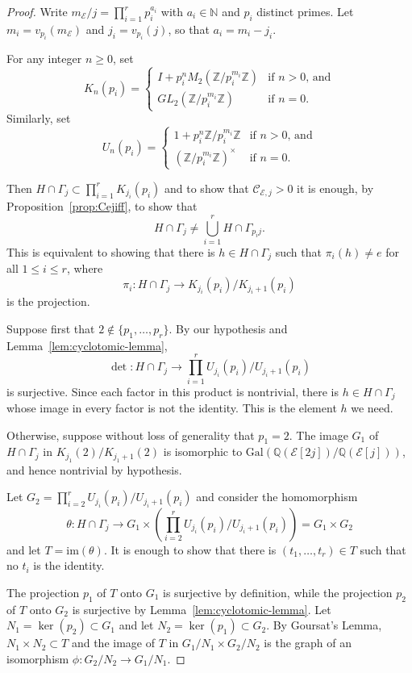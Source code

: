 \documentclass[10pt,a4paper]{amsart}
\newcommand{\Cc}{\mathcal{C}}
\newcommand{\E}{\mathcal{E}}
\newcommand{\Gal}{\mathrm{Gal}}
\newcommand{\N}{\mathbb{N}}
\newcommand{\Q}{\mathbb{Q}}
\newcommand{\Z}{\mathbb{Z}}
\newcommand{\im}{\mathrm{im}}
\begin{document}
\begin{proof}
    Write $m_\E/j = \prod_{i=1}^r p_i^{a_i}$ with $a_i \in \N$ and $p_i$ distinct primes. Let $m_i = v_{p_i}(m_\E)$ and $j_i = v_{p_i}(j)$, so that $a_i = m_i - j_i$. 

    For any integer $n\ge 0$, set 
    \[K_n(p_i) = \begin{cases}
        I + p_i^nM_2(\Z/p_i^{m_i}\Z) & \text{if $n > 0$, and}\\
        GL_2(\Z/p_i^{m_i}\Z) & \text{if $n = 0$.}
    \end{cases}\]
    Similarly, set 
     \[U_n(p_i) = \begin{cases}
        1 + p_i^n\Z/p_i^{m_i}\Z & \text{if $n > 0$, and}\\
        (\Z/p_i^{m_i}\Z)^\times & \text{if $n = 0$.}
    \end{cases}\]

    Then $H \cap \Gamma_j \subset \prod_{i=1}^r K_{j_i}(p_i)$ and to show that $\Cc_{\E,j} > 0$ it is enough, by Proposition~\ref{prop:Cejiff}, to show that 
    \[H \cap \Gamma_j \ne \bigcup_{i=1}^r H \cap \Gamma_{p_ij}.\]
    This is equivalent to showing that there is $h \in H \cap \Gamma_j$ such that $\pi_i(h) \ne e$ for all $1 \le i \le r$, where 
    \[\pi_i : H \cap \Gamma_j \to K_{j_i}(p_i)/K_{j_i + 1}(p_i)\]
    is the projection.

    Suppose first that $2 \not \in \{p_1, \ldots, p_r\}$. By our hypothesis and Lemma~\ref{lem:cyclotomic-lemma}, 
    \[\det : H \cap \Gamma_j \to \prod_{i=1}^r U_{j_i}(p_i)/U_{j_i+1}(p_i)\]
    is surjective. Since each factor in this product is nontrivial, there is $h \in H \cap \Gamma_j$ whose image in every factor is not the identity. This is the element $h$ we need.

    Otherwise, suppose without loss of generality that $p_1 = 2$. The image $G_1$ of $H\cap \Gamma_j$ in $K_{j_1}(2)/K_{j_1 + 1}(2)$ is isomorphic to $\Gal(\Q(\E[2j])/\Q(\E[j]))$, and hence nontrivial by hypothesis.

    Let $G_2 = \prod_{i=2}^rU_{j_i}(p_i)/U_{j_i + 1}(p_i)$ and consider the homomorphism 
    \[\theta : H \cap \Gamma_j \to G_1 \times \left(\prod_{i=2}^r U_{j_i}(p_i)/U_{j_i + 1}(p_i)\right) = G_1 \times G_2\]
    and let $T = \im(\theta)$. It is enough to show that there is $(t_1, \ldots, t_r) \in T$ such that no $t_i$ is the identity.
    
    The projection $p_1$ of $T$ onto $G_1$ is surjective by definition, while the projection $p_2$ of $T$ onto $G_2$ is
    surjective by Lemma~\ref{lem:cyclotomic-lemma}. Let $N_1 = \ker(p_2) \subset G_1$ and let
    $N_2 = \ker(p_1) \subset G_2$. By Goursat's Lemma, $N_1 \times N_2 \subset T$ and the image of $T$ in
    $G_1/N_1 \times G_2 / N_2$ is the graph of an isomorphism $\phi : G_2/N_2 \to G_1/N_1$.


\end{proof}
\end{document}
